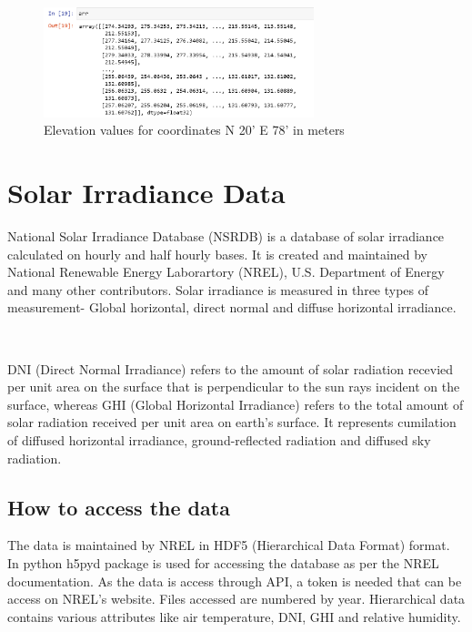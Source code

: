 \documentclass[letterpaper]{article}
\begin{document}
\begin{figure}[H]
    \includegraphics[width=0.7\textwidth]{ElevationData}
    \caption{Elevation values for coordinates N 20' E 78' in meters}
    \centering
\end{figure}



\section{Solar Irradiance Data}

National Solar Irradiance Database (NSRDB)\cite{Sengupta_Xie_Lopez_Habte_Maclaurin_Shelby_2018} is a database of solar irradiance calculated on hourly and half 
hourly bases. It is created and maintained by National Renewable Energy Laborartory (NREL), U.S. Department of Energy 
and many other contributors. Solar irradiance is measured in three types of measurement- Global horizontal,
direct normal and diffuse horizontal irradiance. 

\

DNI (Direct Normal Irradiance) refers to the amount of solar radiation recevied per unit area on the surface
that is perpendicular to the sun rays incident on the surface, whereas GHI (Global Horizontal Irradiance)
refers to the total amount of solar radiation received per unit area on earth's surface. It represents 
cumilation of diffused horizontal irradiance, ground-reflected radiation and diffused sky radiation.



\subsection{How to access the data}

The data is maintained by NREL in HDF5 (Hierarchical Data Format) format. In python h5pyd\cite{collette_python_hdf5_2014} package is used for accessing the database as per the NREL
documentation. As the data is access through API, a token is needed that can be access on 
NREL's website. Files accessed are numbered by year. Hierarchical data contains various attributes
like air temperature, DNI, GHI and relative humidity.
\end{document}
